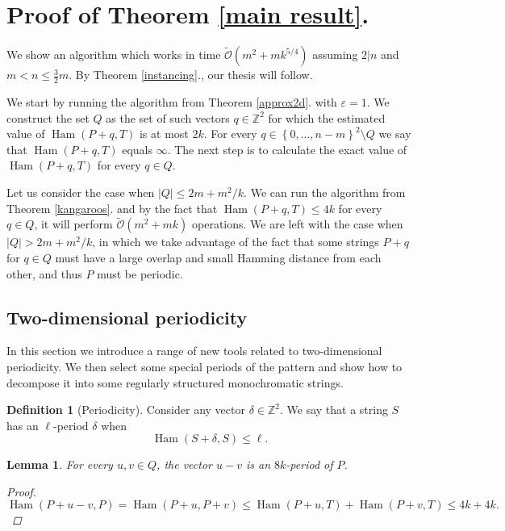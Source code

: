 \documentclass[11pt]{article}
\DeclareMathOperator*{\Ham}{Ham}
\newcommand{\Z}{\mathbb{Z}}
\newcommand{\tO}{\tilde{\mathcal{O}}}
\newcommand{\set}[1]{\left\lbrace #1 \right\rbrace}
\theoremstyle{plain}
\newtheorem{lemma}{Lemma}
\theoremstyle{definition}
\newtheorem{definition}{Definition}
\theoremstyle{remark}
\begin{document}
\section{Proof of Theorem \ref{main result}.}
We show an algorithm which works in time $\tO(m^2 + mk^{5/4})$ assuming $2|n$ and $m < n \le \frac{3}{2}m$.
By Theorem \ref{instancing}., our thesis will follow.

We start by running the algorithm from Theorem \ref{approx2d}. with $\varepsilon = 1$.
We construct the set $Q$ as the set of such vectors $q \in \Z^2$ for which the estimated value of $\Ham(P + q, T)$ is at most $2k$.
For every $q \in \set{0, \dots, n - m}^2 \setminus Q$ we say that $\Ham(P + q, T)$ equals $\infty$.
The next step is to calculate the exact value of $\Ham(P + q, T)$ for every $q \in Q$.

Let us consider the case when $|Q| \le 2m + m^2/k$.
We can run the algorithm from Theorem \ref{kangaroos}. and by the fact that $\Ham(P + q, T) \le 4k$ for every $q \in Q$, it will perform $\tO(m^2 + mk)$ operations.
We are left with the case when $|Q| > 2m + m^2/k$, in which we take advantage of the fact that some strings $P + q$ for $q \in Q$ must have a large overlap and small Hamming distance from each other, and thus $P$ must be periodic.


\newcommand{\T}{\mathcal{T}}
\renewcommand{\S}{\mathcal{S}}
\renewcommand{\P}{\mathcal{P}}
\newcommand{\U}{\mathcal{U}}
\newcommand{\V}{\mathcal{V}}
\newcommand{\F}{\mathcal{F}}
\renewcommand{\L}{\mathcal{L}}


\subsection{Two-dimensional periodicity}
In this section we introduce a range of new tools related to two-dimensional periodicity.
We then select some special periods of the pattern and show how to decompose it into some regularly structured monochromatic strings.


\begin{definition}[Periodicity]
	Consider any vector $\delta \in \Z^2$.
	We say that a string $S$ has an $\ell$-period $\delta$ when
	$$ \Ham(S + \delta, S) \le \ell. $$
\end{definition}


\begin{lemma} \label{periodicity_lemma}
	For every $u, v \in Q$, the vector $u - v$ is an $8k$-period of $P$.
	\begin{proof}
		$\Ham(P + u - v, P) = \Ham(P + u, P + v) \le \Ham(P + u, T) + \Ham(P + v, T) \le 4k + 4k. $
	\end{proof}
\end{lemma}
\end{document}
